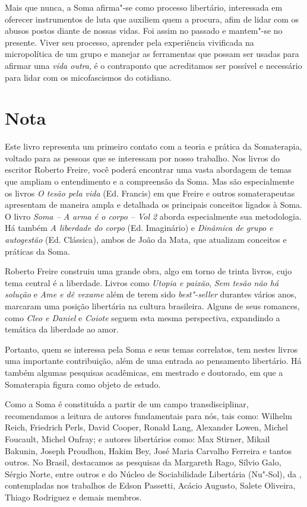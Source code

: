 Mais que nunca, a Soma afirma"-se como processo libertário, interessada
em oferecer instrumentos de luta que auxiliem quem a procura, afim de
lidar com os abusos postos diante de nossas vidas. Foi assim no passado
e mantem"-se no presente. Viver seu processo, aprender pela experiência
vivificada na micropolítica de um grupo e manejar as ferramentas que
possam ser usadas para afirmar uma \emph{vida outra}, é o contraponto
que acreditamos ser possível e necessário para lidar com os
micofascismos do cotidiano.

\chapter{Nota}

Este livro representa um primeiro contato com a teoria e prática da
Somaterapia, voltado para as pessoas que se interessam por nosso
trabalho. Nos livros do escritor Roberto Freire, você poderá encontrar
uma vasta abordagem de temas que ampliam o entendimento e a compreensão
da Soma. Mas são especialmente os livros \emph{O tesão pela vida} (Ed.
Francis) em que Freire e outros somaterapeutas apresentam de maneira
ampla e detalhada os principais conceitos ligados à Soma. O livro
\emph{Soma -- A arma é o corpo -- Vol 2} aborda especialmente sua
metodologia. Há também \emph{A liberdade do corpo} (Ed.
Imaginário) e \emph{Dinâmica de grupo e autogestão} (Ed. Clássica),
ambos de João da Mata, que atualizam conceitos e práticas da Soma.

Roberto Freire construiu uma grande obra, algo em torno de trinta
livros, cujo tema central é a liberdade. Livros como \emph{Utopia e paixão},
\emph{Sem tesão não há solução} e \emph{Ame e dê vexame} além de terem sido
\emph{best"-seller} durantes vários anos, marcaram uma posição libertária
na cultura brasileira. Alguns de seus romances, como \emph{Cleo e Daniel} e
\emph{Coiote} seguem esta mesma perspectiva, expandindo a temática da
liberdade ao amor.

Portanto, quem se interessa pela Soma e seus temas correlatos, tem
nestes livros uma importante contribuição, além de uma entrada ao
pensamento libertário. Há também algumas pesquisas acadêmicas, em
mestrado e doutorado, em que a Somaterapia figura como objeto de estudo.

Como a Soma é constituída a partir de um campo transdisciplinar,
recomendamos a leitura de autores fundamentais para nós, tais como:
Wilhelm Reich, Friedrich Perls, David Cooper, Ronald Lang, Alexander
Lowen, Michel Foucault, Michel Onfray; e autores libertários como: Max
Stirner, Mikail Bakunin, Joseph Proudhon, Hakim Bey, José Maria Carvalho
Ferreira e tantos outros. No Brasil, destacamos as pesquisas da
Margareth Rago, Sílvio Galo, Sérgio Norte, entre outros e do Núcleo de
Sociabilidade Libertária (Nu"-Sol), da , contempladas nos trabalhos
de Edson Passetti, Acácio Augusto, Salete Oliveira, Thiago Rodriguez e
demais membros.

